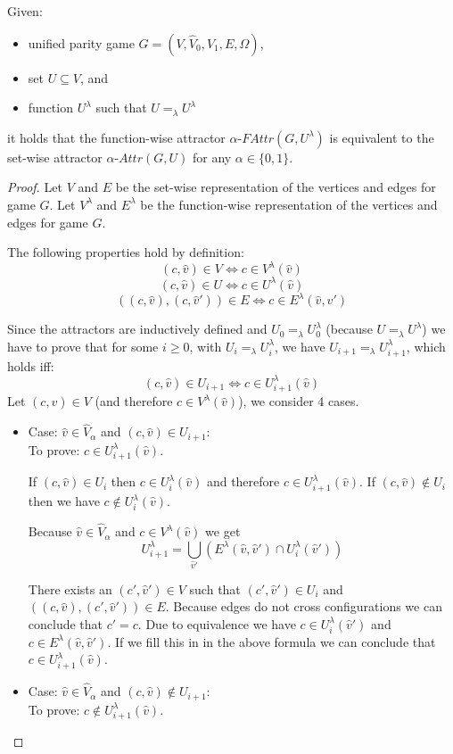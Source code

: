 \begin{lemma}
	\label{lem_attr_equal}
	Given:
	\begin{itemize}
		\item unified parity game $G = ({V},\hat{V}_0,\hat{V}_1, {E}, \hat{\Omega})$,
		\item set ${U} \subseteq {V}$, and
		\item function $U^\lambda$ such that $U =_\lambda U^\lambda$
	\end{itemize}
it holds that the function-wise attractor $\alpha\textit{-FAttr}(G,{U^\lambda})$ is equivalent to the set-wise attractor $\alpha\textit{-Attr}(G,{U})$ for any $\alpha \in \{0,1\}$.
	\begin{proof}
		Let $V$ and $E$ be the set-wise representation of the vertices and edges for game $G$. Let $V^\lambda$ and $E^\lambda$ be the function-wise representation of the vertices and edges for game $G$.
		
		The following properties hold by definition:
		\[ (c,\hat{v}) \in V \iff c \in V^\lambda(\hat{v})\]
		\[ (c,\hat{v}) \in U \iff c \in U^\lambda(\hat{v})\]
		\[ ((c,\hat{v}),(c,\hat{v}')) \in E \iff c \in E^\lambda(\hat{v},\hat{v}') \]
		
		Since the attractors are inductively defined and $U_0 =_\lambda U^\lambda_0$ (because $U =_\lambda U^\lambda$) we have to prove that for some $i \geq 0$, with $U_i =_\lambda U^\lambda_i$,  we have $U_{i+1} =_\lambda U^\lambda_{i+1}$, which holds iff:
		\[ (c,\hat{v}) \in U_{i+1} \iff c \in U^\lambda_{i+1}(\hat{v}) \]
		Let $(c,\hat{v}) \in V$ (and therefore $c \in V^\lambda(\hat{v})$), we consider 4 cases.
		\begin{itemize}
			\item Case: $\hat{v} \in \hat{V}_{\alpha}$ and $(c,\hat{v}) \in U_{i+1}$:\\
			To prove: $c \in U^\lambda_{i+1}(\hat{v})$.
			
			If $(c,\hat{v}) \in U_i$ then $c \in U^\lambda_i(\hat{v})$ and therefore $c \in U^\lambda_{i+1}(\hat{v})$. If $(c,\hat{v}) \notin U_i$ then we have $c \notin U^\lambda_i(\hat{v})$.
			
			
			Because $\hat{v} \in \hat{V}_{\alpha}$ and $c \in V^\lambda(\hat{v})$ we get
			\[ U^\lambda_{i+1} =\bigcup_{\hat{v}'} (E^\lambda(\hat{v},\hat{v}') \cap U^\lambda_i(\hat{v}')) \]
			
			There exists an $(c',\hat{v}') \in V$ such that $(c',\hat{v}') \in U_i$ and $((c,\hat{v}),(c',\hat{v}')) \in E$. Because edges do not cross configurations we can conclude that $c' = c$. Due to equivalence we have $c \in U^\lambda_i(\hat{v}')$ and $c \in E^\lambda(\hat{v},\hat{v}')$. If we fill this in in the above formula we can conclude that $c \in U^\lambda_{i+1}(\hat{v})$.
			\item Case: $\hat{v} \in \hat{V}_{\alpha}$ and $(c,\hat{v}) \notin U_{i+1}$:\\
			To prove: $c \notin U^\lambda_{i+1}(\hat{v})$.
			

\end{itemize}
\end{proof}
\end{lemma}
